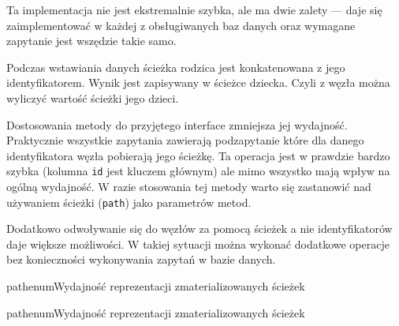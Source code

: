 Ta implementacja nie jest ekstremalnie szybka, ale ma dwie zalety ---
daje się zaimplementować w każdej z obsługiwanych baz danych oraz wymagane zapytanie jest wszędzie takie samo.




Podczas wstawiania danych ścieżka rodzica jest konkatenowana z jego identyfikatorem.
Wynik jest zapisywany w ścieżce dziecka.
Czyli z węzła można wyliczyć wartość ścieżki jego dzieci.











Dostosowania metody do przyjętego interface zmniejsza jej wydajność.
Praktycznie wszystkie zapytania zawierają podzapytanie które dla danego identyfikatora węzła  pobierają jego ścieżkę.
Ta operacja jest w prawdzie bardzo szybka (kolumna \texttt{id} jest kluczem głównym) ale mimo wszystko mają wpływ na ogólną wydajność.
W razie stosowania tej metody warto się zastanowić nad używaniem ścieżki (\texttt{path}) jako parametrów metod. 

Dodatkowo odwoływanie się do węzłów za pomocą ścieżek a nie identyfikatorów daje większe możliwości.
W takiej sytuacji można wykonać dodatkowe operacje bez konieczności wykonywania zapytań w bazie danych.


\begin{qxtab}{pathenum}{Wydajność reprezentacji zmaterializowanych ścieżek}
\end{qxtab}

\begin{qxfig}{pathenum}{Wydajność reprezentacji zmaterializowanych ścieżek}
\end{qxfig}


